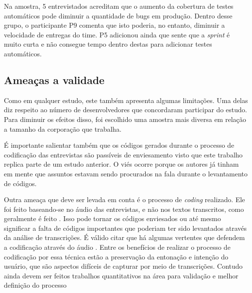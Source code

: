 Na amostra, 5 entrevistados acreditam que o aumento da cobertura de testes automáticos pode diminuir a quantidade de bugs em produção. Dentro desse grupo, o participante P9 comenta que isto poderia, no entanto, diminuir a velocidade de entregas do time. P5 adicionou ainda que sente que a \emph{sprint} é muito curta e não consegue tempo dentro destas para adicionar testes automáticos.

\subsection{Ameaças a validade}

Como em qualquer estudo, este também apresenta algumas limitações. Uma delas diz respeito ao número de desenvolvedores que concordaram participar do estudo. Para diminuir os efeitos disso, foi escolhido uma amostra mais diversa em relação a tamanho da corporação que trabalha.

É importante salientar também que os códigos gerados durante o processo de codificação das entrevistas são passíveis de enviesamento visto que este trabalho replica parte de um estudo anterior. O viés ocorre porque os autores já tinham em mente que assuntos estavam sendo procurados na fala durante o levantamento de códigos. 

Outra ameaça que deve ser levada em conta é o processo de \emph{coding} realizado. Ele foi feito baseando-se no áudio das entrevistas, e não nos textos transcritos, como geralmente é feito \cite{groundedTheory}. Isso pode tornar os códigos enviesados ou até mesmo significar a falta de códigos importantes que poderiam ter sido levantados através da análise de transcrições. É válido citar que há algumas vertentes que defendem a codificação através do áudio \cite{listenCode}. Entre os benefícios de realizar o processo de codificação por essa técnica estão a preservação da entonação e intenção do usuário, que são aspectos difíceis de capturar por meio de transcrições. Contudo ainda devem ser feitos trabalhos quantitativos na área para validação e melhor definição do processo 
